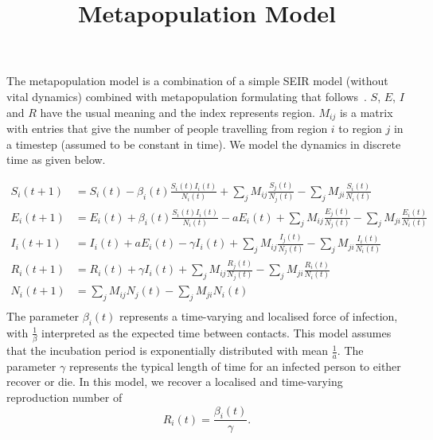 \documentclass[10pt]{article}
\title{Metapopulation Model}
\begin{document}
\maketitle

The metapopulation model is a combination of a simple SEIR model (without vital dynamics)
combined with metapopulation formulating that follows~\cite{Li490}.
$S$, $E$, $I$ and $R$ have the usual meaning and the index represents region.
$M_{ij}$ is a matrix with entries that give the number of people travelling from region $i$ 
to region $j$ in a timestep (assumed to be constant in time).
We model the dynamics in discrete time as given below.

\begin{align*}
    S_i(t+1) &= S_i(t) -\beta_i(t)  \frac{S_i(t) I_i(t)}{N_i(t)} + \sum_{j} M_{ij} \frac{S_j(t)}{N_j(t)} - \sum_{j} M_{ji} \frac{S_i(t)}{N_i(t)}\\
    E_i(t+1) &= E_i(t) +\beta_i(t)  \frac{S_i(t) I_i(t) }{N_i(t)} - a E_i(t) + \sum_{j} M_{ij} \frac{E_j(t)}{N_j(t)} - \sum_{j} M_{ji} \frac{E_i(t)}{N_i(t)}\\
    I_i(t+1) &= I_i(t) + a E_i(t) - \gamma I_i(t) + \sum_{j} M_{ij} \frac{I_j(t)}{N_j(t)} - \sum_{j} M_{ji} \frac{I_i(t)}{N_i(t)}\\
    R_i(t+1) &= R_i(t) + \gamma I_i(t) + \sum_{j} M_{ij} \frac{R_j(t)}{N_j(t)} - \sum_{j} M_{ji} \frac{R_i(t)}{N_i(t)}\\
    N_i(t+1) &=  \sum_{j} M_{ij} N_j(t) - \sum_{j} M_{ji} N_i(t)\\
\end{align*}
The parameter $\beta_i(t)$ represents a time-varying and localised force of infection,
with $\frac{1}{\beta}$ interpreted as the expected time between contacts.
This model assumes that the incubation period is exponentially distributed
with mean $\frac{1}{a}$.
The parameter $\gamma$ represents the typical length of time for an infected person to 
either recover or die.
In this model, we recover a localised and time-varying reproduction number of
\[
    R_i(t) = \frac{\beta_i(t)}{\gamma}  .
\]


\clearpage


\end{document}
